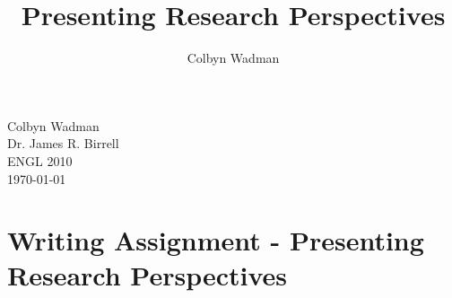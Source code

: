 \documentclass[12pt]{article}
\title{Presenting Research Perspectives}
\author{Colbyn Wadman}
\begin{document}
\begin{flushleft}

Colbyn Wadman\\
Dr. James R. Birrell\\
ENGL 2010\\
\today\\
\section*{\centering Writing Assignment - Presenting Research Perspectives}
\setcounter{section}{1}

\setlength{\parindent}{0.5in} 






\end{flushleft}
\end{document}
